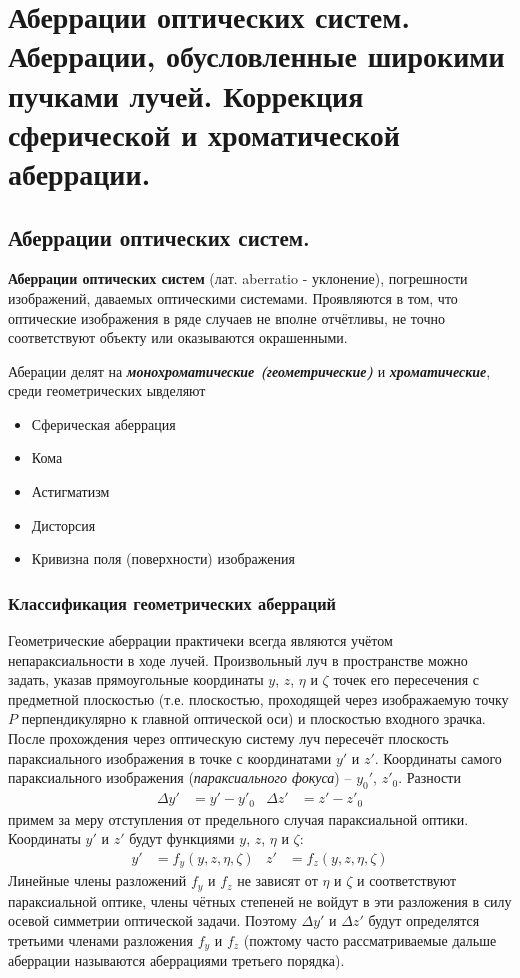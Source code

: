 \section{Аберрации оптических систем. Аберрации, обусловленные широкими пучками лучей. Коррекция сферической и хроматической аберрации.}
	\subsection{Аберрации оптических систем.}
	\begin{definition}
		\textbf{Аберрации оптических систем} (лат. aberratio - уклонение),
		погрешности изображений, даваемых оптическими системами.
		Проявляются в том, что оптические изображения в ряде случаев не
		вполне отчётливы, не точно соответствуют объекту или оказываются
		окрашенными.
	\end{definition}
	Аберации делят на \textbf{\textit{монохроматические (геометрические)}} и \textbf{\textit{хроматические}}, среди геометрических ывделяют
	\begin{itemize}
		\item Сферическая аберрация
		\item Кома
		\item Астигматизм
		\item Дисторсия 
		\item Кривизна поля (поверхности) изображения
	\end{itemize}
	\subsubsection{Классификация геометрических аберраций}
	Геометрические аберрации практичеки всегда являются учётом непараксиальности в ходе лучей. Произвольный луч в пространстве можно задать, указав прямоугольные координаты $y$, $z$, $\eta$ и $\zeta$ точек его пересечения с  предметной плоскостью (т.е. плоскостью, проходящей через изображаемую точку $P$ перпендикулярно к главной оптической оси) и плоскостью входного зрачка. После прохождения через оптическую систему луч пересечёт плоскость параксиального изображения в точке с координатами $y'$ и $z'$. Координаты самого параксиального изображения (\textit{параксиального фокуса}) -- $y_{0}'$, $z'_{0}$. Разности
	\begin{align*}
	\Delta y' &= y' - y'_{0} & \Delta z' &= z'- z'_{0}
	\end{align*} 
	примем за меру отступления от предельного случая параксиальной оптики.
	Координаты $y'$  и  $z'$ будут функциями $y$, $z$, $\eta$ и $\zeta$:
	\begin{align*}
	y' &= f_{y}(y,z,\eta,\zeta) & z' &= f_{z}(y,z,\eta,\zeta)
	\end{align*}
	Линейные члены разложений $f_{y}$ и $f_{z}$ не зависят от $\eta$ и $\zeta$ и соответствуют параксиальной оптике, члены чётных степеней не войдут в эти разложения в силу осевой симметрии оптической задачи. Поэтому $\Delta y'$ и $\Delta z'$ будут определятся третьими членами разложения $f_{y}$ и $f_{z}$ (пожтому часто рассматриваемые дальше аберрации называются аберрациями третьего порядка).
	 
